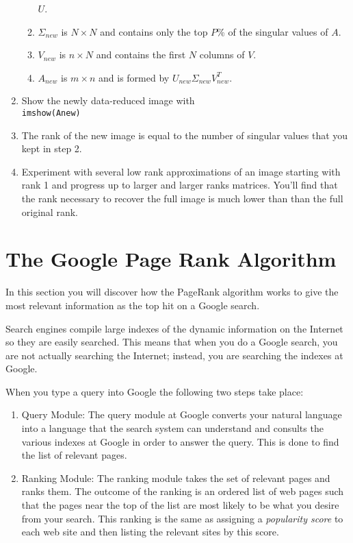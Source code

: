 \begin{problem}
\begin{enumerate}
\begin{enumerate}
                    $U$.
                \item $\Sigma_{new}$ is $N \times N$ and contains only the top $P$\% of
                    the singular values of $A$.
                \item $V_{new}$ is $n \times N$ and contains the first $N$ columns of $V$.
                \item $A_{new}$ is $m \times n$ and is formed by $U_{new} \Sigma_{new}
                    V_{new}^T$.  
            \end{enumerate}
        \item Show the newly data-reduced image with \\
            \texttt{imshow(Anew)}
        \item The rank of the new image is equal to the number of singular values that you
            kept in step 2.  
        \item Experiment with several low rank approximations of an image starting with
            rank 1 and progress up to larger and larger ranks matrices.  You'll find that
            the rank necessary to recover the full image is much lower than than the full
            original rank.
    \end{enumerate}
\end{problem}


\section{The Google Page Rank Algorithm}
In this section you will discover how the PageRank algorithm works to give the most relevant
information as the top hit on a Google search.  

Search engines compile large indexes of the dynamic information on the Internet so they
are easily searched.  This means that when you do a Google search, you are not actually
searching the Internet; instead, you are searching the indexes at Google.

When you type a query into Google the following two steps take place:
\begin{enumerate}
    \item Query Module: The query module at Google converts your natural language into a
        language that the search system can understand and consults the various indexes
        at Google in order to answer the query.  This is done to find the list of relevant
        pages.
    \item Ranking Module: The ranking module takes the set of relevant pages and ranks
        them. The outcome of the ranking is an ordered list of web pages such
        that the pages near the top of the list are most likely to be what you desire from
        your search. This ranking is the same as assigning a {\it popularity score} to
        each web site and then listing the relevant sites by this score.  
\end{enumerate}

